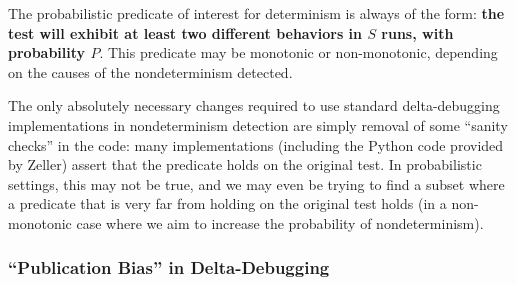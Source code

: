 The probabilistic predicate of interest for determinism is always of
the form:  {\bf the test will exhibit at least two different behaviors in $S$
runs, with probability $P$}.  This predicate may be monotonic or
non-monotonic, depending on the causes of the nondeterminism detected.

The only absolutely necessary changes required to use standard
delta-debugging implementations in nondeterminism detection
are simply removal of some ``sanity checks'' in the code:  many
implementations (including the Python code provided by Zeller) assert
that the predicate holds on the original test.  In probabilistic
settings, this may not be true, and we may even be trying to find a
subset where a predicate that is very far from holding on the original test
holds (in a non-monotonic case where we aim to increase the probability
of nondeterminism).

\subsubsection{``Publication Bias'' in Delta-Debugging}
\label{sec:pubbias}

